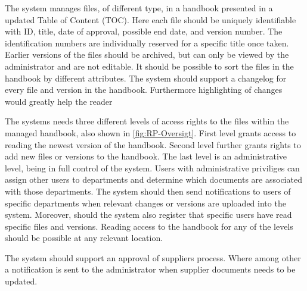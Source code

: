 The system manages files, of different type, in a handbook presented in a updated Table of Content (TOC).
Here each file should be uniquely identifiable with ID, title, date of approval, possible end date, and version number. 
The identification numbers are individually reserved for a specific title once taken.
Earlier versions of the files should be archived, but can only be viewed by the administrator and are not editable.
It should be possible to sort the files in the handbook by different attributes.
The system should support a changelog for every file and version in the handbook. 
Furthermore highlighting of changes would greatly help the reader

The systems needs three different levels of access rights to the files within the managed handbook, also shown in \cref{fig:RP-Oversigt}.
First level grants access to reading the newest version of the handbook. 
Second level further grants rights to add new files or versions to the handbook. 
The last level is an administrative level, being in full control of the system.
Users with administrative priviliges can assign other users to departments and determine which documents are associated with those departments.
The system should then send notifications to users of specific departments when relevant changes or versions are uploaded into the system.
Moreover, should the system also register that specific users have read specific files and versions.
Reading access to the handbook for any of the levels should be possible at any relevant location.

The system should support an approval of suppliers process.
Where among other a notification is sent to the administrator when supplier documents needs to be updated. 


